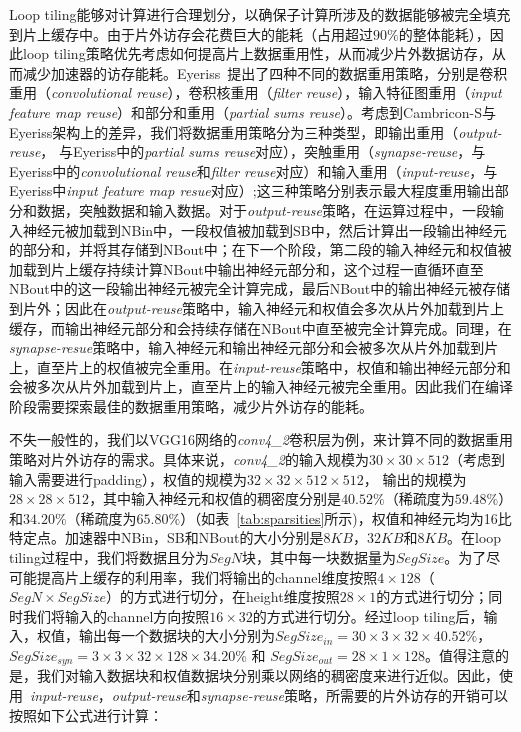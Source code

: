 Loop tiling能够对计算进行合理划分，以确保子计算所涉及的数据能够被完全填充到片上缓存中。由于片外访存会花费巨大的能耗（占用超过$90\%$的整体能耗），因此loop tiling策略优先考虑如何提高片上数据重用性，从而减少片外数据访存，从而减少加速器的访存能耗。Eyeriss~\cite{chen2017eyeriss}提出了四种不同的数据重用策略，分别是卷积重用（\emph{convolutional reuse}），卷积核重用（\emph{filter reuse}），输入特征图重用（\emph{input feature map reuse}）和部分和重用（\emph{partial sums reuse}）。考虑到Cambricon-S与Eyeriss架构上的差异，我们将数据重用策略分为三种类型，即输出重用（\emph{output-reuse}， 与Eyeriss中的\emph{partial sums reuse}对应），突触重用（\emph{synapse-reuse}，与Eyeriss中的\emph{convolutional reuse}和\emph{filter reuse}对应）和输入重用（\emph{input-reuse}，与Eyeriss中\emph{input feature map resue}对应）;这三种策略分别表示最大程度重用输出部分和数据，突触数据和输入数据。对于\emph{output-reuse}策略，在运算过程中，一段输入神经元被加载到NBin中，一段权值被加载到SB中，然后计算出一段输出神经元的部分和，并将其存储到NBout中；在下一个阶段，第二段的输入神经元和权值被加载到片上缓存持续计算NBout中输出神经元部分和，这个过程一直循环直至NBout中的这一段输出神经元被完全计算完成，最后NBout中的输出神经元被存储到片外；因此在\emph{output-reuse}策略中，输入神经元和权值会多次从片外加载到片上缓存，而输出神经元部分和会持续存储在NBout中直至被完全计算完成。同理，在\emph{synapse-resue}策略中，输入神经元和输出神经元部分和会被多次从片外加载到片上，直至片上的权值被完全重用。在\emph{input-reuse}策略中，权值和输出神经元部分和会被多次从片外加载到片上，直至片上的输入神经元被完全重用。因此我们在编译阶段需要探索最佳的数据重用策略，减少片外访存的能耗。

不失一般性的，我们以VGG16网络的\emph{conv4\_2}卷积层为例，来计算不同的数据重用策略对片外访存的需求。具体来说，\emph{conv4\_2}的输入规模为$30\times 30\times 512$（考虑到输入需要进行padding），权值的规模为$32\times 32\times 512\times 512$， 输出的规模为$28\times 28\times 512$，其中输入神经元和权值的稠密度分别是$40.52\%$（稀疏度为$59.48\%$）和$34.20\%$（稀疏度为$65.80\%$）（如表~\ref{tab:sparsities}所示)，权值和神经元均为16比特定点。加速器中NBin，SB和NBout的大小分别是$8KB$，$32KB$和$8KB$。在loop tiling过程中，我们将数据且分为$SegN$块，其中每一块数据量为$SegSize$。为了尽可能提高片上缓存的利用率，我们将输出的channel维度按照$4\times 128$（$SegN\times SegSize$）的方式进行切分，在height维度按照$28\times 1$的方式进行切分；同时我们将输入的channel方向按照$16\times 32$的方式进行切分。经过loop tiling后，输入，权值，输出每一个数据块的大小分别为$SegSize_{in} = 30\times 3\times 32\times 40.52\%$， $SegSize_{syn} = 3\times 3\times 32\times 128\times 34.20\%$ 和 $SegSize_{out} = 28\times 1\times 128$。值得注意的是，我们对输入数据块和权值数据块分别乘以网络的稠密度来进行近似。因此，使用~\emph{input-reuse}，\emph{output-reuse}和\emph{synapse-reuse}策略，所需要的片外访存的开销可以按照如下公式进行计算：

